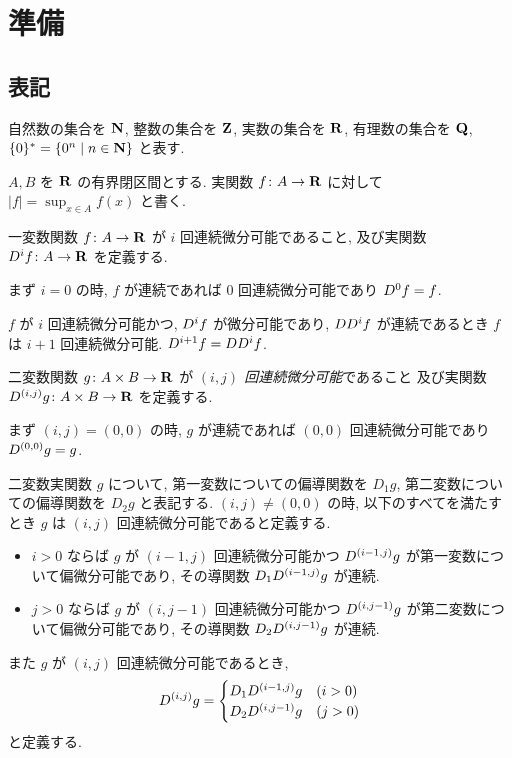\section{準備}
\label{section: preliminaries}

\subsection{表記}
自然数の集合を $\mathbf N$, 整数の集合を $\mathbf Z$, 実数の集合を $\mathbf R$, 
有理数の集合を $\mathbf Q$, $\{0\}^* = \{0^n \mid n \in \mathbf N\}$ と表す.

$A, B$ を $\mathbf R$ の有界閉区間とする. 
実関数 $f \colon A \to \mathbf R$ に対して $|f| = \sup_{x \in A} f(x)$ と書く.

一変数関数 $f\colon A \to \mathbf R$ が $i$ 回連続微分可能であること,
及び実関数 $D^i f \colon A \to \mathbf R$ を定義する.

まず $i = 0$ の時, $f$ が連続であれば
$0$ 回連続微分可能であり $D^0 f = f$.

$f$ が $i$ 回連続微分可能かつ,
$D^i f$ が微分可能であり,
$D D^i f$ が連続であるとき $f$ は $i+1$ 回連続微分可能.
$D^{i+1} f = D D^i f$.


二変数関数 $g \colon A \times B \to \mathbf R$ が
\emph{$(i, j)$ 回連続微分可能}であること
及び実関数 $D^{(i,j)} g \colon A \times B \to \mathbf R$ を定義する.

まず $(i, j) = (0, 0)$ の時, $g$ が連続であれば
$(0, 0)$ 回連続微分可能であり $D^{(0,0)} g = g$.

二変数実関数 $g$ について, 第一変数についての偏導関数を $D_1 g$,
第二変数についての偏導関数を $D_2 g$ と表記する.
$(i, j) \not= (0, 0)$ の時, 以下のすべてを満たすとき
$g$ は $(i, j)$ 回連続微分可能であると定義する.
\begin{itemize}
 \item $i>0$ ならば $g$ が $(i-1, j)$ 回連続微分可能かつ
       $D^{(i-1, j)} g$ が第一変数について偏微分可能であり,
       その導関数 $D_1 D^{(i-1, j)} g$ が連続.
 \item $j>0$ ならば $g$ が $(i, j-1)$ 回連続微分可能かつ
       $D^{(i, j-1)} g$ が第二変数について偏微分可能であり,
       その導関数 $D_2 D^{(i, j-1)} g$ が連続.
\end{itemize}
また $g$ が $(i, j)$ 回連続微分可能であるとき,
\begin{equation}
 D^{(i, j)} g = 
  \begin{cases}
   D_1 D^{(i-1, j)} g & (i > 0)
   \\
   D_2 D^{(i, j-1)} g & (j > 0)
  \end{cases}
\end{equation}
と定義する.

